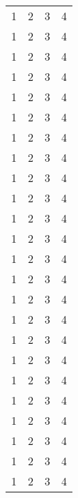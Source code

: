 \begin{longtable}{|c|c|c|c|}
1 & 2 & 3 & 4 \\ 1 & 2 & 3 & 4 \\ 1 & 2 & 3 & 4 \\ 1 & 2 & 3 & 4 \\
1 & 2 & 3 & 4 \\ 1 & 2 & 3 & 4 \\ 1 & 2 & 3 & 4 \\ 1 & 2 & 3 & 4 \\
1 & 2 & 3 & 4 \\ 1 & 2 & 3 & 4 \\ 1 & 2 & 3 & 4 \\ 1 & 2 & 3 & 4 \\
1 & 2 & 3 & 4 \\ 1 & 2 & 3 & 4 \\ 1 & 2 & 3 & 4 \\ 1 & 2 & 3 & 4 \\
1 & 2 & 3 & 4 \\ 1 & 2 & 3 & 4 \\ 1 & 2 & 3 & 4 \\ 1 & 2 & 3 & 4 \\
1 & 2 & 3 & 4 \\ 1 & 2 & 3 & 4 \\ 1 & 2 & 3 & 4 \\ 1 & 2 & 3 & 4 \\
\end{longtable}